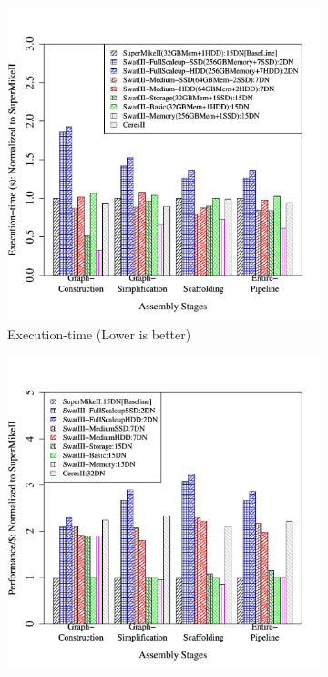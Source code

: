\documentclass[conference]{IEEEtran}
\begin{document}
\begin{figure}[htb]
        \begin{subfigure}[b]{0.5\textwidth}
                \includegraphics[width=\textwidth, height=.3\textheight]{Figure/PerormanceData/Plots/PerfDiffArch.pdf}
                \caption{Execution-time (Lower is better)}
                \label{fig:DifferentArchitecturesPerf}
        \end{subfigure}
        \begin{subfigure}[b]{0.5\textwidth}
                \includegraphics[width=\textwidth, height=.3\textheight]{Figure/PerormanceData/Plots/PerfPerDollarDiffArch.pdf}

\end{subfigure}
\end{figure}
\end{document}
